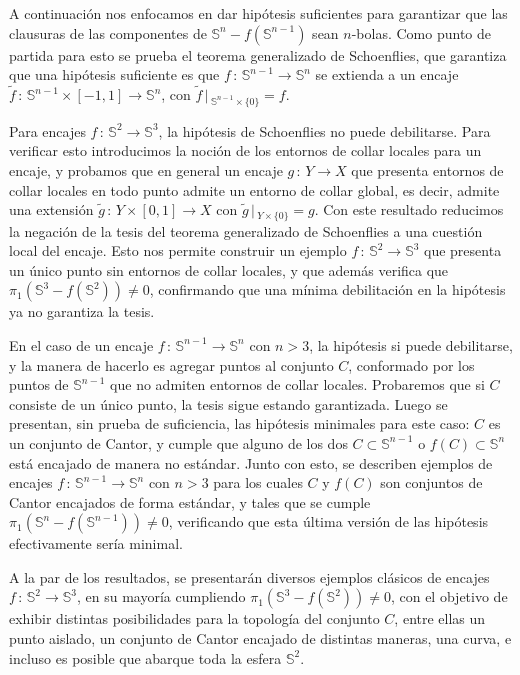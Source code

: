\documentclass[11pt]{article}
\newcommand{\s}{\mathbb{S}}
\begin{document}
A continuación nos enfocamos en dar hipótesis suficientes para garantizar que las clausuras de las componentes de $\s^{n}-f(\s^{n-1})$ sean $n$-bolas. Como punto de partida para esto se prueba el teorema generalizado de Schoenflies, que garantiza que una hipótesis suficiente es que $f\,\colon\,\s^{n-1}\to\s^n$ se extienda a un encaje $\tilde{f}\,\colon\,\s^{n-1}\times [-1,1]\to\s^n$, con $\tilde{f}\,|\,_{\s^{n-1}\times\{0\}} = f$. 

Para encajes $f\,\colon\,\s^2\to\s^3$, la hipótesis de Schoenflies no puede debilitarse. Para verificar esto introducimos la noción de los entornos de collar locales para un encaje, y probamos que en general un encaje $g\,\colon\, Y\to X$ que presenta entornos de collar locales en todo punto admite un entorno de collar global, es decir, admite una extensión $\tilde{g}\,\colon\, Y\times [0,1]\to X$ con $\tilde{g}\,|\,_{Y\times\{0\}}=g$. Con este resultado reducimos la negación de la tesis del teorema generalizado de Schoenflies a una cuestión local del encaje. Esto nos permite construir un ejemplo $f\,\colon\,\s^2\to\s^3$ que presenta un único punto sin entornos de collar locales, y que además verifica que $\pi_1(\s^3 - f(\s^2))\neq 0$, confirmando que una mínima debilitación en la hipótesis ya no garantiza la tesis. 

En el caso de un encaje $f\,\colon\,\s^{n-1}\to\s^n$ con $n>3$, la hipótesis si puede debilitarse, y la manera de hacerlo es agregar puntos al conjunto $C$, conformado por los puntos de $\s^{n-1}$ que no admiten entornos de collar locales. Probaremos que si $C$ consiste de un único punto, la tesis sigue estando garantizada. Luego se presentan, sin prueba de suficiencia, las hipótesis minimales para este caso: $C$ es un conjunto de Cantor, y cumple que alguno de los dos $C\subset\s^{n-1}$ o $f(C)\subset\s^n$ está encajado de manera no estándar. Junto con esto, se describen ejemplos de encajes $f\,\colon\,\s^{n-1}\to\s^n$ con $n>3$ para los cuales $C$ y $f(C)$ son conjuntos de Cantor encajados de forma estándar, y tales que se cumple $\pi_1(\s^n-f(\s^{n-1}))\neq 0$, verificando que esta última versión de las hipótesis efectivamente sería minimal.

A la par de los resultados, se presentarán diversos ejemplos clásicos de encajes $f\,\colon\,\s^2\to\s^3$, en su mayoría cumpliendo $\pi_1(\s^3 - f(\s^2))\neq 0$, con el objetivo de exhibir distintas posibilidades para la topología del conjunto $C$, entre ellas un punto aislado, un conjunto de Cantor encajado de distintas maneras, una curva, e incluso es posible que abarque toda la esfera $\s^2$.
\end{document}
